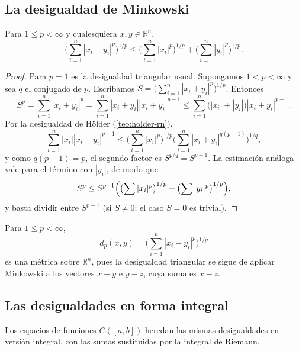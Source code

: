 \subsection{La desigualdad de Minkowski}

\begin{theorem}
\label{teo:minkowski-rn}
Para $1\leq p<\infty$ y cualesquiera $x,y\in\mathbb{R}^n$,
\[
  \biggl(\sum_{i=1}^{n}|x_i+y_i|^p\biggr)^{1/p}\leq\biggl(\sum_{i=1}^{n}|x_i|^p\biggr)^{1/p}+\biggl(\sum_{i=1}^{n}|y_i|^p\biggr)^{1/p}.
\]
\end{theorem}
\begin{proof}
Para $p=1$ es la desigualdad triangular usual. Supongamos $1<p<\infty$ y sea $q$ el conjugado de $p$. Escribamos $S=\bigl(\sum_{i=1}^{n}|x_i+y_i|^p\bigr)^{1/p}$. Entonces
\[
  S^p=\sum_{i=1}^{n}|x_i+y_i|^p=\sum_{i=1}^{n}|x_i+y_i||x_i+y_i|^{p-1}\leq\sum_{i=1}^{n}\bigl(|x_i|+|y_i|\bigr)|x_i+y_i|^{p-1}.
\]
Por la desigualdad de Hölder (\cref{teo:holder-rn}),
\[
  \sum_{i=1}^{n}|x_i||x_i+y_i|^{p-1}\leq\biggl(\sum_{i=1}^{n}|x_i|^p\biggr)^{1/p}\biggl(\sum_{i=1}^{n}|x_i+y_i|^{q(p-1)}\biggr)^{1/q},
\]
y como $q(p-1)=p$, el segundo factor es $S^{p/q}=S^{p-1}$. La estimación análoga vale para el término con $|y_i|$, de modo que
\[
  S^p\leq S^{p-1}\Bigl(\bigl(\sum|x_i|^p\bigr)^{1/p}+\bigl(\sum|y_i|^p\bigr)^{1/p}\Bigr),
\]
y basta dividir entre $S^{p-1}$ (si $S\neq 0$; el caso $S=0$ es trivial).
\end{proof}

\begin{corollary}
\label{cor:lp-metrica-rn}
Para $1\leq p<\infty$,
\[
  d_p(x,y)=\biggl(\sum_{i=1}^{n}|x_i-y_i|^p\biggr)^{1/p}
\]
es una métrica sobre $\mathbb{R}^n$, pues la desigualdad triangular se sigue de aplicar Minkowski a los vectores $x-y$ e $y-z$, cuya suma es $x-z$.
\end{corollary}

\subsection{Las desigualdades en forma integral}

Los espacios de funciones $C([a,b])$ heredan las mismas desigualdades en versión integral, con las sumas sustituidas por la integral de Riemann.

